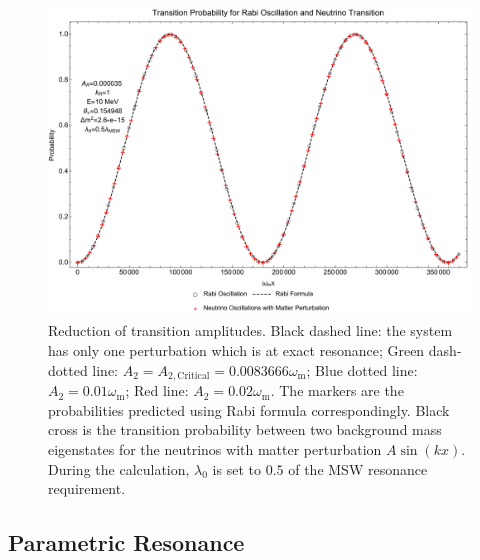 \documentclass[%
reprint,
 amsmath,amssymb,
 aps,
]{revtex4-1}
\begin{document}

\begin{figure}[!htbp]
                \centering
                \includegraphics[width=\columnwidth]{assets/rabiOscillationsNeutrinoCoincidence}
                \caption{Reduction of transition amplitudes. Black dashed line: the system has only one perturbation which is at exact resonance; Green dash-dotted line: $A_2=A_{2,\mathrm{Critical}}=0.0083666\omega_{\mathrm m}$; Blue dotted line: $A_2=0.01\omega_{\mathrm m}$; Red line: $A_2=0.02\omega_{\mathrm m}$. The markers are the probabilities predicted using Rabi formula correspondingly. Black cross is the transition probability between two background mass eigenstates for the neutrinos with matter perturbation $A\sin(kx)$. During the calculation, $\lambda_0$ is set to $0.5$ of the MSW resonance requirement.}
                \label{fig-rabiOscillationsNeutrinoCoincidence}
\end{figure}






\subsection{Parametric Resonance}
\end{document}
